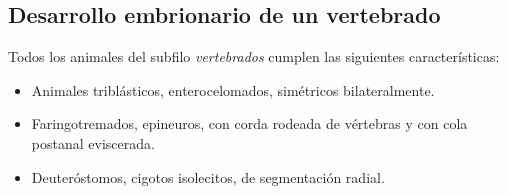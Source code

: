 \subsection{Desarrollo embrionario de un vertebrado}
Todos los animales del subfilo \textit{vertebrados} cumplen las siguientes características:
\begin{itemize}[itemsep=0pt,parsep=0pt,topsep=0pt,partopsep=0pt]
    \item Animales triblásticos, enterocelomados, simétricos bilateralmente.
    \item Faringotremados, epineuros, con corda rodeada de vértebras y con cola postanal eviscerada.
    \item Deuteróstomos, cigotos isolecitos, de segmentación radial.
\end{itemize}

